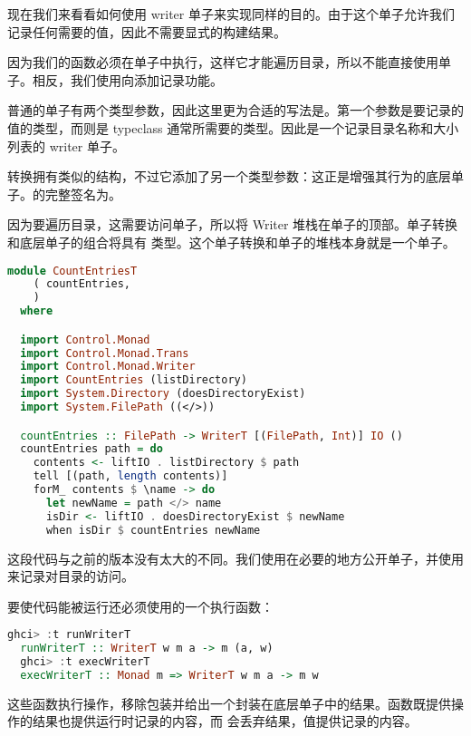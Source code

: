 \documentclass[./main.tex]{subfiles}
\begin{document}
现在我们来看看如何使用 writer 单子来实现同样的目的。由于这个单子允许我们记录任何需要的值，因此不需要显式的构建结果。

因为我们的函数必须在单子中执行，这样它才能遍历目录，所以不能直接使用单子。相反，我们使用向添加记录功能。

普通的单子有两个类型参数，因此这里更为合适的写法是。第一个参数是要记录的值的类型，而则是
typeclass 通常所需要的类型。因此是一个记录目录名称和大小列表的 writer 单子。

转换拥有类似的结构，不过它添加了另一个类型参数：这正是增强其行为的底层单子。的完整签名为。

因为要遍历目录，这需要访问单子，所以将 Writer 堆栈在单子的顶部。单子转换和底层单子的组合将具有
类型。这个单子转换和单子的堆栈本身就是一个单子。

\begin{lstlisting}[language=Haskell]
  module CountEntriesT
    ( countEntries,
    )
  where

  import Control.Monad
  import Control.Monad.Trans
  import Control.Monad.Writer
  import CountEntries (listDirectory)
  import System.Directory (doesDirectoryExist)
  import System.FilePath ((</>))

  countEntries :: FilePath -> WriterT [(FilePath, Int)] IO ()
  countEntries path = do
    contents <- liftIO . listDirectory $ path
    tell [(path, length contents)]
    forM_ contents $ \name -> do
      let newName = path </> name
      isDir <- liftIO . doesDirectoryExist $ newName
      when isDir $ countEntries newName
\end{lstlisting}

这段代码与之前的版本没有太大的不同。我们使用在必要的地方公开单子，并使用来记录对目录的访问。

要使代码能被运行还必须使用的一个执行函数：

\begin{lstlisting}[language=Haskell]
  ghci> :t runWriterT
  runWriterT :: WriterT w m a -> m (a, w)
  ghci> :t execWriterT
  execWriterT :: Monad m => WriterT w m a -> m w
\end{lstlisting}

这些函数执行操作，移除包装并给出一个封装在底层单子中的结果。函数既提供操作的结果也提供运行时记录的内容，而
会丢弃结果，值提供记录的内容。
\end{document}
